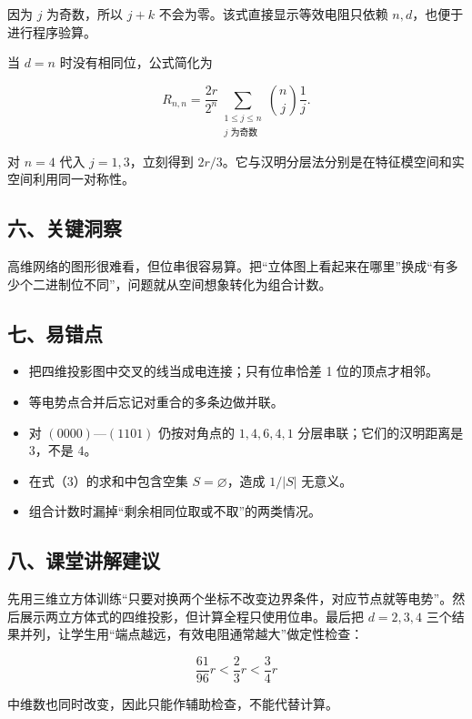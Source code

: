 \documentclass[12pt,a4paper,UTF8]{ctexart}
\newcommand{\tightlist}{\setlength{\itemsep}{0pt}\setlength{\parskip}{0pt}}
\begin{document}
因为 \(j\) 为奇数，所以 \(j+k\) 不会为零。该式直接显示等效电阻只依赖
\(n,d\)，也便于进行程序验算。

当 \(d=n\) 时没有相同位，公式简化为

\[
R_{n,n}
=\frac{2r}{2^n}
\sum_{\substack{1\leq j\leq n\\j\text{ 为奇数}}}
\binom nj\frac1j.
\]

对 \(n=4\) 代入 \(j=1,3\)，立刻得到
\(2r/3\)。它与汉明分层法分别是在特征模空间和实空间利用同一对称性。

\subsection{六、关键洞察}\label{ux516dux5173ux952eux6d1eux5bdf-3}

高维网络的图形很难看，但位串很容易算。把``立体图上看起来在哪里''换成``有多少个二进制位不同''，问题就从空间想象转化为组合计数。

\subsection{七、易错点}\label{ux4e03ux6613ux9519ux70b9-3}

\begin{itemize}
\tightlist
\item
  把四维投影图中交叉的线当成电连接；只有位串恰差 1 位的顶点才相邻。
\item
  等电势点合并后忘记对重合的多条边做并联。
\item
  对 \((0000)\)---\((1101)\) 仍按对角点的 \(1,4,6,4,1\)
  分层串联；它们的汉明距离是 \(3\)，不是 \(4\)。
\item
  在式（3）的求和中包含空集 \(S=\varnothing\)，造成 \(1/|S|\) 无意义。
\item
  组合计数时漏掉``剩余相同位取或不取''的两类情况。
\end{itemize}

\subsection{八、课堂讲解建议}\label{ux516bux8bfeux5802ux8bb2ux89e3ux5efaux8bae-3}

先用三维立方体训练``只要对换两个坐标不改变边界条件，对应节点就等电势''。然后展示两立方体式的四维投影，但计算全程只使用位串。最后把
\(d=2,3,4\)
三个结果并列，让学生用``端点越远，有效电阻通常越大''做定性检查：

\[
\frac{61}{96}r<\frac23r<\frac34r
\]

中维数也同时改变，因此只能作辅助检查，不能代替计算。
\end{document}

